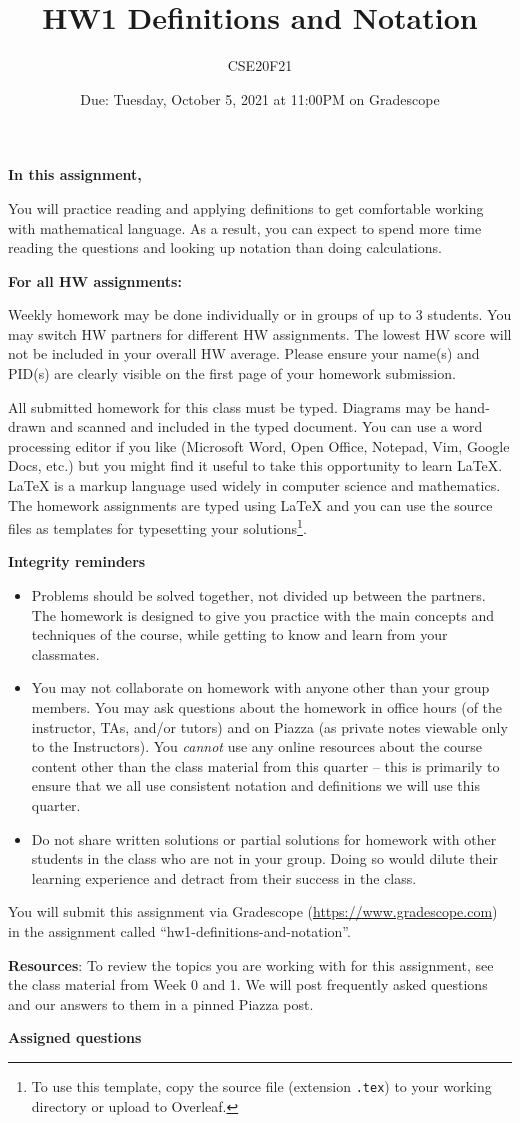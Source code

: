 \documentclass[12pt, oneside]{article}
\author{CSE20F21}
\title{HW1 Definitions and Notation}
\date{Due: Tuesday, October 5, 2021 at 11:00PM on Gradescope}
\newcommand{\instructions}{{\bf For all HW assignments:}

Weekly homework may be done individually or in groups of up to 3 students. 
You may switch HW partners for different HW assignments. 
The lowest HW score will not be included in your overall HW average. 
Please ensure your name(s) and PID(s) are clearly visible on the first page of your homework submission.

All submitted homework for this class must be typed. 
Diagrams may be hand-drawn and scanned and included in the typed document. 
You can use a word processing editor if you like (Microsoft Word, Open Office, Notepad, Vim, Google Docs, etc.) 
but you might find it useful to take this opportunity to learn LaTeX. 
LaTeX is a markup language used widely in computer science and mathematics. 
The homework assignments are typed using LaTeX and you can use the source files 
as templates for typesetting your solutions\footnote{To use this template, copy the source file (extension \texttt{.tex}) 
to your working directory or upload to Overleaf.}.


{\bf Integrity reminders}
\begin{itemize}
\item Problems should be solved together, not divided up between the partners. The homework is
designed to give you practice with the main concepts and techniques of the course, 
while getting to know and learn from your classmates.
\item You may not collaborate on homework with anyone other than your group members.
You may ask questions about the homework in office hours (of the instructor, TAs, and/or tutors) and 
on Piazza (as private notes viewable only to the Instructors).  
You \emph{cannot} use any online resources about the course content other than the class material 
from this quarter -- this is primarily to ensure that we all use consistent notation and
definitions we will use this quarter.
\item Do not share written solutions or partial solutions for homework with 
other students in the class who are not in your group. Doing so would dilute their learning 
experience and detract from their success in the class.
\end{itemize}

}
\begin{document}
\maketitle
\thispagestyle{fancy}


{\bf In this assignment,}

You will practice reading and
applying definitions to get comfortable working with mathematical language. As
a result, you can expect to spend more time reading the questions and looking
up notation than doing calculations.

\instructions

You will submit this assignment via Gradescope
(\href{https://www.gradescope.com}{https://www.gradescope.com}) 
in the assignment called ``hw1-definitions-and-notation''.


{\bf Resources}: To review the topics you are working with 
for this assignment, see the class material from  Week 0 and 1.
We will post frequently asked questions and our answers to them in a 
pinned Piazza post.

{\bf Assigned questions}
\end{document}

